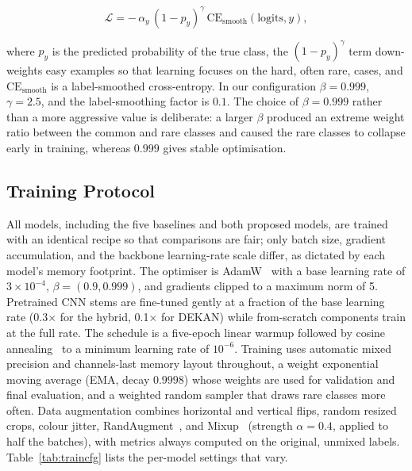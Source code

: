 \begin{equation}
\mathcal{L} = -\,\alpha_y\,(1 - p_y)^{\gamma}\,\mathrm{CE}_{\text{smooth}}(\text{logits}, y),
\end{equation}

where $p_y$ is the predicted probability of the true class, the
$(1-p_y)^{\gamma}$ term down-weights easy examples so that learning focuses on
the hard, often rare, cases, and $\mathrm{CE}_{\text{smooth}}$ is a
label-smoothed cross-entropy. In our configuration $\beta = 0.999$,
$\gamma = 2.5$, and the label-smoothing factor is $0.1$. The choice of
$\beta = 0.999$ rather than a more aggressive value is deliberate: a larger
$\beta$ produced an extreme weight ratio between the common and rare classes and
caused the rare classes to collapse early in training, whereas $0.999$ gives
stable optimisation.

\subsection{Training Protocol}

All models, including the five baselines and both proposed models, are trained with
an identical recipe so that comparisons are fair; only batch size, gradient
accumulation, and the backbone learning-rate scale differ, as dictated by each
model's memory footprint. The optimiser is AdamW~\cite{loshchilov2019adamw} with
a base learning rate of $3\times10^{-4}$, $\beta=(0.9, 0.999)$, and gradients
clipped to a maximum norm of 5. Pretrained CNN stems are fine-tuned gently at a
fraction of the base learning rate (0.3$\times$ for the hybrid, 0.1$\times$ for
DEKAN) while from-scratch components train at the full rate. The schedule is a
five-epoch linear warmup followed by cosine annealing~\cite{loshchilov2017sgdr}
to a minimum learning rate of $10^{-6}$. Training uses automatic mixed precision
and channels-last memory layout throughout, a weight exponential moving average
(EMA, decay $0.9998$) whose weights are used for validation and final
evaluation, and a weighted random sampler that draws rare classes more often.
Data augmentation combines horizontal and vertical flips, random resized crops,
colour jitter, RandAugment~\cite{cubuk2020randaugment}, and
Mixup~\cite{zhang2018mixup} (strength $\alpha=0.4$, applied to half the batches),
with metrics always computed on the original, unmixed labels. Table~\ref{tab:traincfg}
lists the per-model settings that vary.

